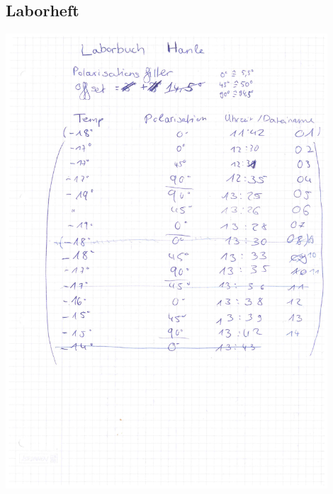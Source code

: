 \documentclass[12pt]{article}
\begin{document}
\subsection{Laborheft}\label{laborbuch}
\begin{minipage}{\textwidth}
	\centering
	\includegraphics[width=0.9\textwidth]{laborbuch/laborbuch1.pdf}
\end{minipage}
\end{document}
